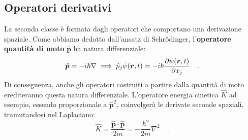 \subsection{Operatori derivativi}
La seconda classe è formata dagli operatori che comportano una derivazione spaziale. Come abbiamo dedotto dall'ansatz di Schrödinger, l'\textbf{operatore quantità di moto} $\hat{\bm{p}}$ ha natura differenziale:
\begin{equation}
    \hat{\bm{p}} = -i\hbar\nabla \implies \hat{p}_j \psi(\bm{r},t) = -i\hbar \pdv{\psi(\bm{r},t)}{x_j} \quad.
\end{equation}
Di conseguenza, anche gli operatori costruiti a partire dalla quantità di moto erediteranno questa natura differenziale. L'operatore energia cinetica $\hat{K}$ ad esempio, essendo proporzionale a $\hat{\bm{p}}^2$, coinvolgerà le derivate seconde spaziali, tramutandosi nel Laplaciano:
\begin{equation*}
    \hat{K} = \frac{\hat{\bm{p}} \cdot \hat{\bm{p}}}{2m} = -\frac{\hbar^2}{2m}\nabla^2 \quad.
\end{equation*}

